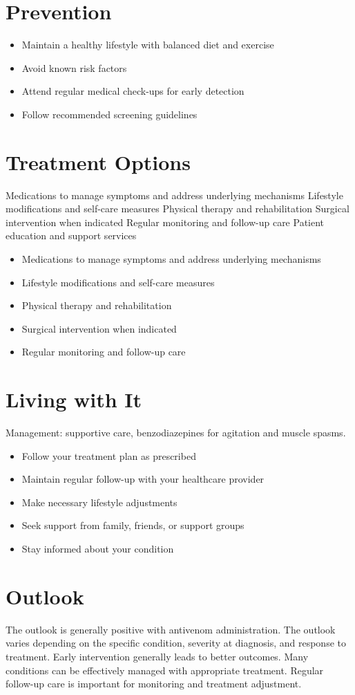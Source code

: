 \section{Prevention}
\begin{itemize}[noitemsep]
  \item Maintain a healthy lifestyle with balanced diet and exercise
  \item Avoid known risk factors
  \item Attend regular medical check-ups for early detection
  \item Follow recommended screening guidelines
\end{itemize}
\section{Treatment Options}
Medications to manage symptoms and address underlying mechanisms Lifestyle modifications and self-care measures Physical therapy and rehabilitation Surgical intervention when indicated Regular monitoring and follow-up care Patient education and support services

\begin{itemize}[noitemsep]
  \item Medications to manage symptoms and address underlying mechanisms
  \item Lifestyle modifications and self-care measures
  \item Physical therapy and rehabilitation
  \item Surgical intervention when indicated
  \item Regular monitoring and follow-up care
\end{itemize}
\section{Living with It}
Management: supportive care, benzodiazepines for agitation and muscle spasms.

\begin{itemize}[noitemsep]
  \item Follow your treatment plan as prescribed
  \item Maintain regular follow-up with your healthcare provider
  \item Make necessary lifestyle adjustments
  \item Seek support from family, friends, or support groups
  \item Stay informed about your condition
\end{itemize}
\section{Outlook}
The outlook is generally positive with antivenom administration. The outlook varies depending on the specific condition, severity at diagnosis, and response to treatment. Early intervention generally leads to better outcomes. Many conditions can be effectively managed with appropriate treatment. Regular follow-up care is important for monitoring and treatment adjustment.
